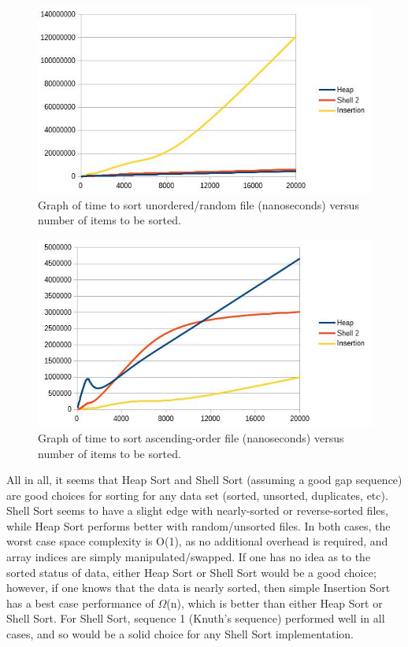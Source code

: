\documentclass[12pt, titlepage]{article}
\begin{document}
\begin{figure} [!htbp]
	\centering
	\includegraphics[width=5in]{ran2}
	\caption{Graph of time to sort unordered/random file (nanoseconds) versus number of items to be sorted.}
\end{figure}

\begin{figure} [!htbp]
	\centering
	\includegraphics[width=5in]{asc2}
	\caption{Graph of time to sort ascending-order file (nanoseconds) versus number of items to be sorted.}
\end{figure}

All in all, it seems that Heap Sort and Shell Sort (assuming a good gap sequence) are good choices for sorting for any data set (sorted, unsorted, duplicates, etc). Shell Sort seems to have a slight edge with nearly-sorted or reverse-sorted files, while Heap Sort performs better with random/unsorted files. In both cases, the worst case space complexity is O(1), as no additional overhead is required, and array indices are simply manipulated/swapped. If one has no idea as to the sorted status of data, either Heap Sort or Shell Sort would be a good choice; however, if one knows that the data is nearly sorted, then simple Insertion Sort has a best case performance of $\Omega$(n), which is better than either Heap Sort or Shell Sort. For Shell Sort, sequence 1 (Knuth's sequence) performed well in all cases, and so would be a solid choice for any Shell Sort implementation.
\end{document}
